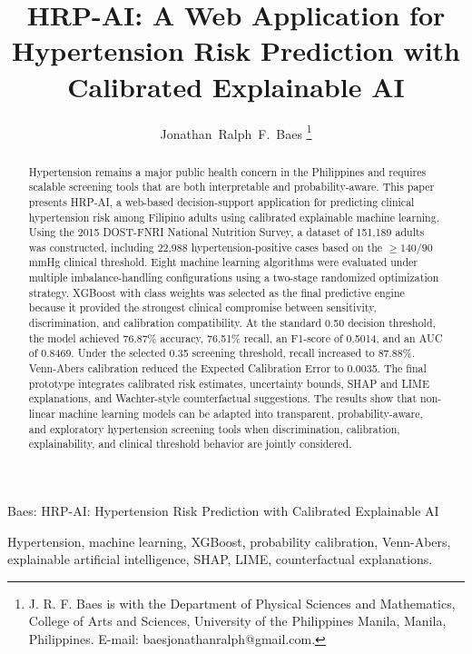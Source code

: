 \documentclass[journal]{IEEEtran}
\begin{document}
\title{HRP-AI: A Web Application for Hypertension Risk Prediction with Calibrated Explainable AI}

\author{Jonathan~Ralph~F.~Baes%
\thanks{J. R. F. Baes is with the Department of Physical Sciences and Mathematics, College of Arts and Sciences, University of the Philippines Manila, Manila, Philippines. E-mail: baesjonathanralph@gmail.com.}%
}

%
{Baes: HRP-AI: Hypertension Risk Prediction with Calibrated Explainable AI}

\maketitle

\begin{abstract}
Hypertension remains a major public health concern in the Philippines and requires scalable screening tools that are both interpretable and probability-aware. This paper presents HRP-AI, a web-based decision-support application for predicting clinical hypertension risk among Filipino adults using calibrated explainable machine learning. Using the 2015 DOST-FNRI National Nutrition Survey, a dataset of 151,189 adults was constructed, including 22,988 hypertension-positive cases based on the $\geq 140/90$ mmHg clinical threshold. Eight machine learning algorithms were evaluated under multiple imbalance-handling configurations using a two-stage randomized optimization strategy. XGBoost with class weights was selected as the final predictive engine because it provided the strongest clinical compromise between sensitivity, discrimination, and calibration compatibility. At the standard 0.50 decision threshold, the model achieved 76.87\% accuracy, 76.51\% recall, an F1-score of 0.5014, and an AUC of 0.8469. Under the selected 0.35 screening threshold, recall increased to 87.88\%. Venn-Abers calibration reduced the Expected Calibration Error to 0.0035. The final prototype integrates calibrated risk estimates, uncertainty bounds, SHAP and LIME explanations, and Wachter-style counterfactual suggestions. The results show that non-linear machine learning models can be adapted into transparent, probability-aware, and exploratory hypertension screening tools when discrimination, calibration, explainability, and clinical threshold behavior are jointly considered.
\end{abstract}

\begin{IEEEkeywords}
Hypertension, machine learning, XGBoost, probability calibration, Venn-Abers, explainable artificial intelligence, SHAP, LIME, counterfactual explanations.
\end{IEEEkeywords}
\end{document}
